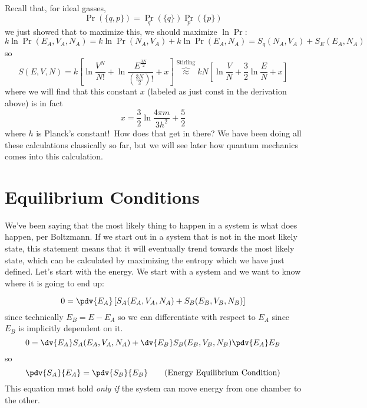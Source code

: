 \documentclass[a4paper,twoside,master.tex]{subfiles}
\begin{document}
Recall that, for ideal gasses,
\begin{equation}
    \Pr(\{q,p\}) = \Pr_{q}(\{q\}) \Pr_{p}(\{p\})
\end{equation}
we just showed that to maximize this, we should maximize $ \ln{\Pr} $:
\begin{equation}
    k \ln{\Pr(E_A, V_A, N_A)} = k \ln{\Pr(N_A, V_A)} + k \ln{\Pr(E_A, N_A)} = S_q(N_A, V_A) + S_E(E_A, N_A)
\end{equation}
so
\begin{equation}
    S(E,V,N) = k \left[ \ln{\frac{V^N}{N!}} + \ln{\frac{E^{\frac{3N}{2}}}{\left( \frac{3N}{2} \right)!}} + x \right] \overbrace{\approx}^{\text{Stirling}} kN \left[ \ln{\frac{V}{N}} + \frac{3}{2} \ln{\frac{E}{N}} + x \right]
\end{equation}
where we will find that this constant $ x $ (labeled as just $ \text{const} $ in the derivation above) is in fact
\begin{equation}
    x = \frac{3}{2} \ln{\frac{4 \pi m}{3 h^2}} + \frac{5}{2}
\end{equation}
where $ h $ is Planck's constant!\ How does that get in there? We have been doing all these calculations classically so far, but we will see later how quantum mechanics comes into this calculation.

\section{Equilibrium Conditions}
\label{sec:equilibrium_conditions}

We've been saying that the most likely thing to happen in a system is what does happen, per Boltzmann. If we start out in a system that is not in the most likely state, this statement means that it will eventually trend towards the most likely state, which can be calculated by maximizing the entropy which we have just defined. Let's start with the energy. We start with a system and we want to know where it is going to end up:

\begin{equation}
    0 = \pdv{E_A}\left[S_A(E_A,V_A,N_A) + S_B(E_B,V_B,N_B)\right]
\end{equation}
since technically $ E_B = E - E_A $ so we can differentiate with respect to $ E_A $ since $ E_B $ is implicitly dependent on it.
\begin{equation}
    0 = \dv{E_A}S_A(E_A,V_A,N_A) + \dv{E_B} S_B(E_B, V_B, N_B) \pdv{E_A} E_B
\end{equation}
so
\begin{equation}\label{eq:energy_equilibrium_condition}
    \pdv{S_A}{E_A} = \pdv{S_B}{E_B}\tag{Energy Equilibrium Condition}
\end{equation}
This equation must hold \textit{only if} the system can move energy from one chamber to the other.
\end{document}
